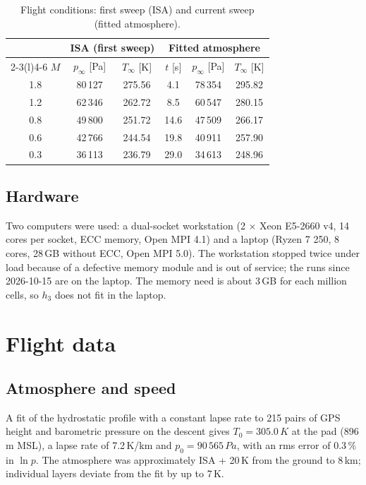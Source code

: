\documentclass[11pt,a4paper]{article}
\newcommand{\unit}[2]{#1\,#2}
\begin{document}
\begin{table}[htbp]
\centering
\caption{Flight conditions: first sweep (ISA) and current sweep (fitted atmosphere).}\label{tab:conditions}
\begin{tabular}{@{}c cc ccc@{}}
\toprule
 & \multicolumn{2}{c}{ISA (first sweep)} & \multicolumn{3}{c}{Fitted atmosphere} \\
\cmidrule(lr){2-3}\cmidrule(l){4-6}
$M$ & $p_\infty$ [Pa] & $T_\infty$ [K] & $t$ [s] & $p_\infty$ [Pa] & $T_\infty$ [K] \\
\midrule
1.8 & 80\,127 & 275.56 & 4.1 & 78\,354 & 295.82 \\
1.2 & 62\,346 & 262.72 & 8.5 & 60\,547 & 280.15 \\
0.8 & 49\,800 & 251.72 & 14.6 & 47\,509 & 266.17 \\
0.6 & 42\,766 & 244.54 & 19.8 & 40\,911 & 257.90 \\
0.3 & 36\,113 & 236.79 & 29.0 & 34\,613 & 248.96 \\
\bottomrule
\end{tabular}
\end{table}

\subsection{Hardware}

Two computers were used: a dual-socket workstation (2 $\times$ Xeon E5-2660 v4, 14 cores
per socket, ECC memory, Open MPI 4.1) and a laptop (Ryzen 7 250, 8 cores, \unit{28}{GB}
without ECC, Open MPI 5.0). The workstation stopped twice under load because of a
defective memory module and is out of service; the runs since 2026-10-15 are on the
laptop. The memory need is about \unit{3}{GB} for each million cells, so $h_3$ does not
fit in the laptop.

\section{Flight data}\label{sec:flight}

\subsection{Atmosphere and speed}

A fit of the hydrostatic profile with a constant lapse rate to 215 pairs of GPS height
and barometric pressure on the descent gives $T_0 = \unit{305.0}{K}$ at the pad
(\unit{896}{m} MSL), a lapse rate of \unit{7.2}{K/km} and $p_0 = \unit{90\,565}{Pa}$,
with an rms error of 0.3\,\% in $\ln p$. The atmosphere was approximately ISA +
\unit{20}{K} from the ground to \unit{8}{km}; individual layers deviate from the fit by
up to \unit{7}{K}.
\end{document}
